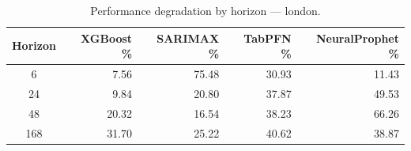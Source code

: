 \begin{table}[h]
\centering
\caption{Performance degradation by horizon — london.}
\label{tab:degradation_horizon_london}
\begin{tabular}{crrrr}
\toprule
Horizon & XGBoost \% & SARIMAX \% & TabPFN \% & NeuralProphet \% \\
\midrule
6 & 7.56 & 75.48 & 30.93 & 11.43 \\
24 & 9.84 & 20.80 & 37.87 & 49.53 \\
48 & 20.32 & 16.54 & 38.23 & 66.26 \\
168 & 31.70 & 25.22 & 40.62 & 38.87 \\
\bottomrule
\end{tabular}
\end{table}
